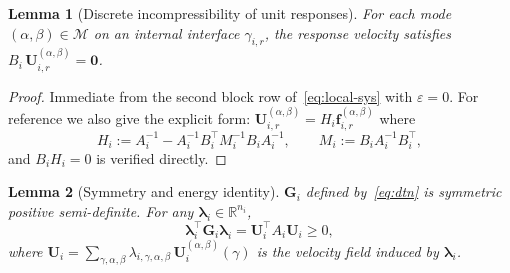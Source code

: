 \documentclass[11pt,a4paper]{article}
\newtheorem{lemma}{Lemma}[section]
\newcommand{\R}{\mathbb{R}}
\newcommand{\iface}{\gamma}
\newcommand{\trac}{\bm{\lambda}}
\newcommand{\DtN}{\mathbf{G}}
\newcommand{\modeset}{\mathcal{M}}
\newcommand{\loadvec}{\bm{f}}
\newcommand{\respvel}{\mathbf{U}}
\begin{document}

\begin{lemma}[Discrete incompressibility of unit responses]\label{lem:incomp}
  For each mode $(\alpha,\beta) \in \modeset$ on an internal interface
  $\iface_{i,r}$, the response velocity satisfies
  $B_i\,\respvel_{i,r}^{(\alpha,\beta)} = \bm{0}$.
\end{lemma}

\begin{proof}
  Immediate from the second block row of~\eqref{eq:local-sys} with
  $\varepsilon = 0$.  For reference we also give the explicit form:
  $\respvel_{i,r}^{(\alpha,\beta)} = H_i \loadvec_{i,r}^{(\alpha,\beta)}$
  where
  \begin{equation}\label{eq:Hdef}
    H_i := A_i^{-1} - A_i^{-1} B_i^\top M_i^{-1} B_i A_i^{-1},\qquad
    M_i := B_i A_i^{-1} B_i^\top,
  \end{equation}
  and $B_i H_i = 0$ is verified directly.
\end{proof}


\begin{lemma}[Symmetry and energy identity]\label{lem:sym}
  $\DtN_i$ defined by~\eqref{eq:dtn} is symmetric positive semi-definite.
  For any $\trac_i \in \R^{n_i}$,
  \begin{equation}\label{eq:energy}
    \trac_i^\top \DtN_i \trac_i
    = \respvel_i^\top A_i \respvel_i \ge 0,
  \end{equation}
  where $\respvel_i = \sum_{\gamma,\alpha,\beta}
    \lambda_{i,\gamma,\alpha,\beta}\,
    \respvel_{i}^{(\alpha,\beta)}(\gamma)$
  is the velocity field induced by $\trac_i$.
\end{lemma}
\end{document}
